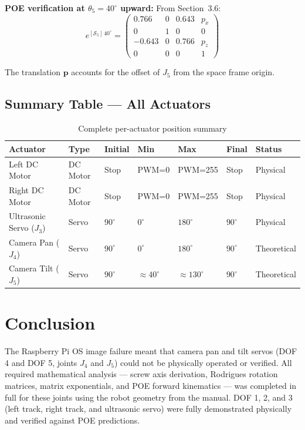 \documentclass[12pt,a4paper]{article}
\newcommand{\vect}[1]{\bm{#1}}
\begin{document}
\textbf{POE verification at $\theta_5 = 40^\circ$ upward:}
From Section~3.6:
\[
  e^{[\mathcal{S}_5]\,40^\circ}
  = \begin{pmatrix}0.766&0&0.643&p_x\\0&1&0&0\\-0.643&0&0.766&p_z\\0&0&0&1\end{pmatrix}
\]

The translation $\vect{p}$ accounts for the offset of $J_5$ from the space frame origin.
\newpage
\subsection{Summary Table --- All Actuators}

\begin{table}[h!]
\centering
\caption{Complete per-actuator position summary}
\renewcommand{\arraystretch}{1.4}
\begin{tabularx}{\linewidth}{L{3cm} C{1.5cm} C{1.8cm} C{1.8cm} C{1.8cm} C{1.8cm} C{2cm}}
\toprule
{}
\color{white}\textbf{Actuator} &
\color{white}\textbf{Type} &
\color{white}\textbf{Initial} &
\color{white}\textbf{Min} &
\color{white}\textbf{Max} &
\color{white}\textbf{Final} &
\color{white}\textbf{Status} \\
\midrule
Left DC Motor & DC Motor & Stop & PWM=0 & PWM=255 & Stop & \color{SuccessGreen}Physical \\
Right DC Motor & DC Motor & Stop & PWM=0 & PWM=255 & Stop & \color{SuccessGreen}Physical \\
Ultrasonic Servo ($J_3$) & Servo & $90^\circ$ & $0^\circ$ & $180^\circ$ & $90^\circ$ & \color{SuccessGreen}Physical \\
Camera Pan ($J_4$) & Servo & $90^\circ$ & $0^\circ$ & $180^\circ$ & $90^\circ$ & \color{DangerRed}Theoretical \\
Camera Tilt ($J_5$) & Servo & $90^\circ$ & ${\approx}40^\circ$ & ${\approx}130^\circ$ & $90^\circ$ & \color{DangerRed}Theoretical \\
\bottomrule
\end{tabularx}
\end{table}

\section{Conclusion}


\vspace{8pt}
The Raspberry Pi OS image failure meant that camera pan and tilt servos (DOF 4
and DOF 5, joints $J_4$ and $J_5$) could not be physically operated or verified.
All required mathematical analysis --- screw axis derivation, Rodrigues rotation
matrices, matrix exponentials, and POE forward kinematics --- was completed in
full for these joints using the robot geometry from the manual. DOF 1, 2, and 3
(left track, right track, and ultrasonic servo) were fully demonstrated physically
and verified against POE predictions.
\end{document}
